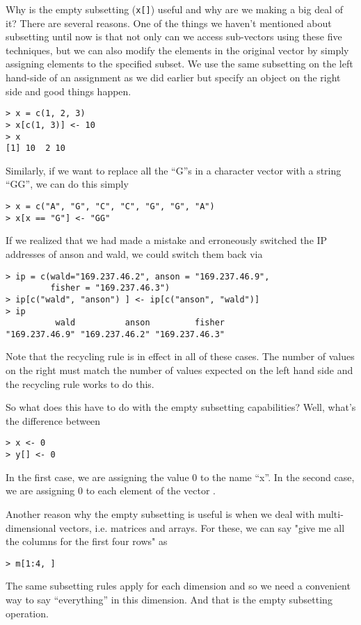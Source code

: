 Why is the empty subsetting (\verb|x[]|) useful and why are we making
a big deal of it? There are several reasons. One of the things we
haven't mentioned about subsetting until now is that not only can we
access sub-vectors using these five techniques, but we can also modify
the elements in the original vector by simply assigning elements to
the specified subset. We use the same subsetting on the left hand-side
of an assignment as we did earlier but specify an object on the right
side and good things happen.
\begin{verbatim}
> x = c(1, 2, 3)
> x[c(1, 3)] <- 10
> x
[1] 10  2 10
\end{verbatim}
Similarly, if we want to replace all the ``G''s in a character vector
with a string ``GG'', we can do this simply
\begin{verbatim}
> x = c("A", "G", "C", "C", "G", "G", "A")
> x[x == "G"] <- "GG"
\end{verbatim}
If we realized that we had made a mistake and erroneously switched the
IP addresses of anson and wald, we could switch them back via
\begin{verbatim}
> ip = c(wald="169.237.46.2", anson = "169.237.46.9", 
         fisher = "169.237.46.3")
> ip[c("wald", "anson") ] <- ip[c("anson", "wald")]
> ip
          wald          anson         fisher 
"169.237.46.9" "169.237.46.2" "169.237.46.3" 
\end{verbatim}
Note that the recycling rule is in effect in all of these cases. The
number of values on the right must match the number of values expected
on the left hand side and the recycling rule works to do this.

So what does this have to do with the empty subsetting capabilities?
Well, what's the difference between
\begin{verbatim}
> x <- 0
> y[] <- 0
\end{verbatim}
In the first case, we are assigning the value 0 to the name ``x''. In
the second case, we are assigning 0 to each element of the vector
.

Another reason why the empty subsetting is useful is when we deal with
multi-dimensional vectors, i.e. matrices and arrays. For these, we can
say "give me all the columns for the first four rows" as
\begin{verbatim}
> m[1:4, ]
\end{verbatim}
The same subsetting rules apply for each dimension and so we need a
convenient way to say ``everything'' in this dimension. And that is the
empty subsetting operation.

